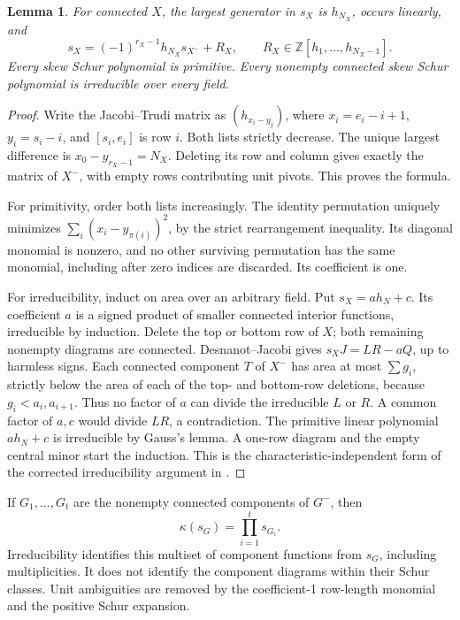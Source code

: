 \documentclass[11pt,a4paper]{amsart}
\numberwithin{equation}{section}
\theoremstyle{plain}
\newtheorem{lemma}[theorem]{Lemma}
\theoremstyle{definition}
\begin{document}
\begin{lemma}\label{lem:cofactor}
For connected \(X\), the largest generator in \(s_X\) is \(h_{N_X}\), occurs linearly, and
\[
 s_X=(-1)^{r_X-1}h_{N_X}s_{X^-}+R_X,
 \qquad R_X\in\mathbb Z[h_1,\ldots,h_{N_X-1}].
\]
Every skew Schur polynomial is primitive.  Every nonempty connected skew Schur polynomial is irreducible over every field.
\end{lemma}
\begin{proof}
Write the Jacobi--Trudi matrix as \((h_{x_i-y_j})\), where \(x_i=e_i-i+1\), \(y_i=s_i-i\), and \([s_i,e_i]\) is row \(i\).  Both lists strictly decrease.  The unique largest difference is \(x_0-y_{r_X-1}=N_X\).  Deleting its row and column gives exactly the matrix of \(X^-\), with empty rows contributing unit pivots.  This proves the formula.

For primitivity, order both lists increasingly.  The identity permutation uniquely minimizes \(\sum_i(x_i-y_{\pi(i)})^2\), by the strict rearrangement inequality.  Its diagonal monomial is nonzero, and no other surviving permutation has the same monomial, including after zero indices are discarded.  Its coefficient is one.

For irreducibility, induct on area over an arbitrary field.  Put \(s_X=a h_N+c\).  Its coefficient \(a\) is a signed product of smaller connected interior functions, irreducible by induction.  Delete the top or bottom row of \(X\); both remaining nonempty diagrams are connected.  Desnanot--Jacobi gives \(s_X J=L R-a Q\), up to harmless signs.  Each connected component \(T\) of \(X^-\) has area at most \(\sum g_i\), strictly below the area of each of the top- and bottom-row deletions, because \(g_i<a_i,a_{i+1}\).  Thus no factor of \(a\) can divide the irreducible \(L\) or \(R\).  A common factor of \(a,c\) would divide \(LR\), a contradiction.  The primitive linear polynomial \(a h_N+c\) is irreducible by Gauss's lemma.  A one-row diagram and the empty central minor start the induction.  This is the characteristic-independent form of the corrected irreducibility argument in \cite[Thm.~1]{Barekat2009CoincidencesCorrigendum}.
\end{proof}

If \(G_1,\ldots,G_t\) are the nonempty connected components of \(G^-\), then
\begin{equation}\label{eq:corner-factors}
 \kappa(s_G)=\prod_{i=1}^t s_{G_i}.
\end{equation}
Irreducibility identifies this multiset of component functions from \(s_G\), including multiplicities.  It does not identify the component diagrams within their Schur classes.  Unit ambiguities are removed by the coefficient-1 row-length monomial and the positive Schur expansion.
\end{document}

